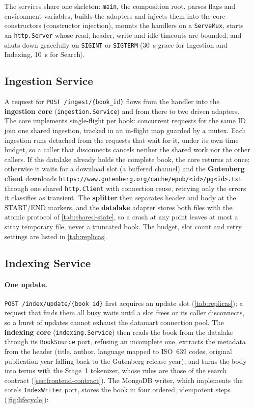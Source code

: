 \documentclass[10pt,a4paper]{article}
\newcommand{\code}[1]{\texttt{#1}}
\newcommand{\route}[1]{\texttt{#1}}
\begin{document}
The services share one skeleton: \code{main}, the composition root, parses
flags and environment variables, builds the adapters and injects them into the
core constructors (constructor injection), mounts the handlers on a
\code{ServeMux}, starts an \code{http.Server} whose read, header, write and
idle timeouts are bounded, and shuts down gracefully on \code{SIGINT} or
\code{SIGTERM} (30~s grace for Ingestion and Indexing, 10~s for Search).

\subsection{Ingestion Service}
\label{sec:impl-ingestion}

A request for \route{POST /ingest/\allowbreak\{book\_id\}} flows from the handler into
the \textbf{ingestion core} (\code{ingestion.Service}) and from there to two
driven adapters. The core implements single-flight per book: concurrent
requests for the same ID join one shared ingestion, tracked in an in-flight map
guarded by a mutex. Each ingestion runs detached from the requests that wait
for it, under its own time budget, so a caller that disconnects cancels neither
the shared work nor the other callers. If the datalake already holds the
complete book, the core returns at once; otherwise it waits for a download slot
(a buffered channel) and the \textbf{Gutenberg client} downloads
\code{https://www.gutenberg.org/\allowbreak cache/epub/<id>/pg<id>.txt} through one shared
\code{http.Client} with connection reuse, retrying only the errors it
classifies as transient. The \textbf{splitter} then separates header and body
at the START/END markers, and the \textbf{datalake} adapter stores both files
with the atomic protocol of \cref{tab:shared-state}, so a crash at any point
leaves at most a stray temporary file, never a truncated book. The budget, slot
count and retry settings are listed in \cref{tab:replicas}.

\subsection{Indexing Service}
\label{sec:impl-indexing}

\paragraph{One update.}
\route{POST /index/update/\allowbreak\{book\_id\}} first acquires an update slot
(\cref{tab:replicas}); a request that finds them all busy waits until a slot
frees or its caller disconnects, so a burst of updates cannot exhaust the
datamart connection pool. The \textbf{indexing core} (\code{indexing.Service})
then reads the book from the datalake through its \code{BookSource} port,
refusing an incomplete one, extracts the metadata from the header (title,
author, language mapped to ISO~639 codes, original publication year falling
back to the Gutenberg release year), and turns the body into terms with the
Stage~1 tokenizer, whose rules are those of the search contract
(\cref{sec:frontend-contract}). The MongoDB writer,
which implements the core's \code{IndexWriter} port, stores the book in four
ordered, idempotent steps (\cref{fig:lifecycle}):
\end{document}
